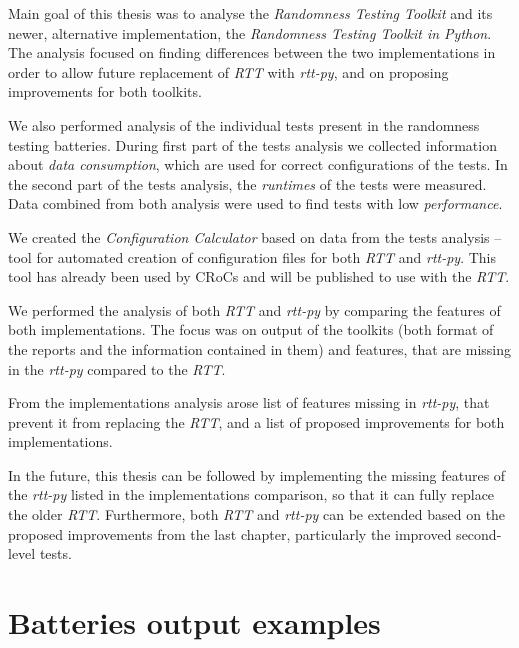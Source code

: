 \documentclass[
  digital,     %
  oneside,     %
  nosansbold,  %
  nocolorbold, %
  nolof,         %
  nolot,         %
]{fithesis4}
\begin{document}
Main goal of this thesis was to analyse the \emph{Randomness Testing Toolkit} and its newer, alternative implementation, the \emph{Randomness Testing Toolkit in Python}. The analysis focused on finding differences between the two implementations in order to allow future replacement of \emph{RTT} with \emph{rtt-py}, and on proposing improvements for both toolkits.


We also performed analysis of the individual tests present in the randomness testing batteries. During first part of the tests analysis we collected information about \emph{data consumption}, which are used for correct configurations of the tests. In the second part of the tests analysis, the \emph{runtimes} of the tests were measured. Data combined from both analysis were used to find tests with low \emph{performance}.



We created the \emph{Configuration Calculator} based on data from the tests analysis -- tool for automated creation of configuration files for both \emph{RTT} and \emph{rtt-py}. This tool has already been used by CRoCs and will be published to use with the \emph{RTT}.

We performed the analysis of both \emph{RTT} and \emph{rtt-py} by comparing the features of both implementations. The focus was on output of the toolkits (both format of the reports and the information contained in them) and features, that are missing in the \emph{rtt-py} compared to the \emph{RTT}.

From the implementations analysis arose list of features missing in \emph{rtt-py}, that prevent it from replacing the \emph{RTT}, and a list of proposed improvements for both implementations.

In the future, this thesis can be followed by implementing the missing features of the \emph{rtt-py} listed in the implementations comparison, so that it can fully replace the older \emph{RTT}. Furthermore, both \emph{RTT} and \emph{rtt-py} can be extended based on the proposed improvements from the last chapter, particularly the improved second-level tests. 


\appendix 

\chapter{Batteries output examples} \label{append:dieharder-output}
\end{document}
